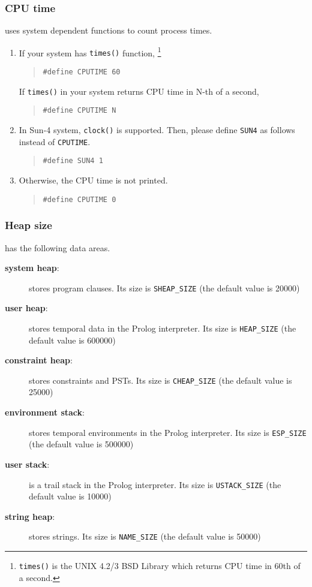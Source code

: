 \subsubsection{CPU time}
\cuprolog uses system dependent functions to count process times.
\begin{enumerate}
\item If your system has {\tt times()} function, 
\footnote{ {\tt times()} is the UNIX 4.2/3 BSD Library which returns 
CPU time in 60th of a second. }
\begin{quote}
 	{\tt \#define CPUTIME	60}
\end{quote}
If {\tt times()} in your system returns CPU time in N-th of a second,
\begin{quote}
	{\tt \#define CPUTIME	N}
\end{quote}
\item In Sun-4 system, {\tt clock()} is supported.
Then, please define {\tt SUN4} as follows instead of {\tt CPUTIME}.
\begin{quote}
	{\tt \#define SUN4	1}
\end{quote}
\item Otherwise, the CPU time is not printed.
\begin{quote}
 	{\tt \#define CPUTIME	0}
\end{quote}
\end{enumerate}

\subsubsection{Heap size}
\cuprolog has the following data areas.
\begin{description}
\item [{\bf system heap}:]	stores program clauses.
	Its size is {\tt SHEAP\_SIZE} (the default value is 20000)
\item [{\bf user heap}:]	stores temporal data in the Prolog interpreter.
	Its size is {\tt HEAP\_SIZE}  (the default value is 600000)
\item [{\bf constraint heap}:]	stores constraints and PSTs.
	Its size is {\tt CHEAP\_SIZE}  (the default value is 25000)
\item [{\bf environment stack}:]	stores temporal environments in the Prolog interpreter.
	Its size is {\tt ESP\_SIZE}  (the default value is 500000)
\item [{\bf user stack}:]	is a trail stack in the Prolog interpreter.
	Its size is {\tt USTACK\_SIZE}  (the default value is 10000)
\item [{\bf string heap}:]	stores strings.
	Its size is {\tt NAME\_SIZE}   (the default value is 50000)
\end{description}

